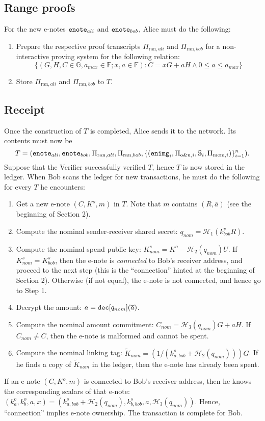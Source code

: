 \documentclass{article}
\begin{document}
\subsection{Range proofs}
For the new e-notes ${\tt enote}_{ali}$ and ${\tt enote}_{bob}$, Alice must do the following:
\begin{enumerate}
    \item Prepare the respective proof transcripts $\Pi_{\text{ran}, ali}$ and $\Pi_{\text{ran}, bob}$ for a non-interactive proving system for the following relation:
$$\{(G, H, C \in\mathbb{G}, a_{max}\in\mathbb{F}; x, a\in\mathbb{F}): C = x G + a H \wedge 0\le a \le a_{max}\}$$
    \item Store $\Pi_{\text{ran}, ali}$ and $\Pi_{\text{ran}, bob}$ to $T$.
\end{enumerate}

\subsection{Receipt}
Once the construction of $T$ is completed, Alice sends it to the network. Its contents must now be
$$T=({\tt enote}_{ali}, {\tt enote}_{bob}, \Pi_{\text{ran}, ali}, \Pi_{\text{ran}, bob}, \{({\tt enimg}_i, \Pi_{\text{o\&u}, i}, \mathbb{S}_i, \Pi_{\text{mem}, i})\}_{i=1}^n).$$
\noindent Suppose that the Verifier successfully verified $T$, hence $T$ is now stored in the ledger. When Bob scans the ledger for new transactions, he must do the following for every $T$ he encounters:
\begin{enumerate}
    \item Get a new e-note $(C, K^o, m)$ in $T$. Note that $m$ contains $(R, \overline{a})$ (see the beginning of Section 2).
    \item Compute the nominal sender-receiver shared secret: $q_{nom} = \mathcal{H}_1(k_{bob}^v R)$.
    \item Compute the nominal spend public key: $K_{nom}^s = K^o - \mathcal{H}_2(q_{nom})U$. If $K_{nom}^s = K_{bob}^s$, then the e-note is \textit{connected} to Bob's receiver address, and proceed to the next step (this is the ``connection'' hinted at the beginning of Section 2).  Otherwise (if not equal), the e-note is not connected, and hence go to Step 1.
    \item Decrypt the amount: $a = {\tt dec}[q_{nom}](\overline a)$.
    \item Compute the nominal amount commitment: $C_{nom} = \mathcal{H}_3(q_{nom})G + a H$. If $C_{nom} \ne C$, then the e-note is malformed and cannot be spent.
    \item Compute the nominal linking tag: $\tilde{K}_{nom} = (1/(k_{a, bob}^s + \mathcal{H}_2(q_{nom})))G$. If he finds a copy of $\tilde{K}_{nom}$ in the ledger, then the e-note has already been spent.
\end{enumerate}
If an e-note $(C, K^o, m)$ is connected to Bob's receiver address, then he knows the corresponding scalars of that e-note: $(k_a^o, k_b^o, a, x) = (k_{a, bob}^s + \mathcal{H}_2(q_{nom}), k_{b, bob}^s, a, \mathcal{H}_3(q_{nom}))$. Hence, ``connection'' implies e-note ownership. The transaction is complete for Bob.
\end{document}
